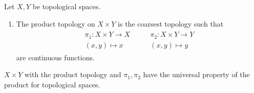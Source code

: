 \documentclass[12pt, twosided]{article}
\begin{document}
\begin{thm}
  Let \(X, Y\) be topological spaces.
  \begin{enumerate}
  \item The product topology on \(X \times Y\) is the coarsest topology such that
    \begin{align*}
      \begin{matrix}
        \pi_1: X \times Y \to X \\ (x, y) \mapsto x
      \end{matrix} \quad\quad
      \begin{matrix}
        \pi_2: X \times Y \to Y \\ (x, y) \mapsto y
      \end{matrix}
    \end{align*} are continuous functions.
  \end{enumerate}
\item \(X \times Y\) with the product topology and \(\pi_1, \pi_2\) have the universal property of the product for topological spaces.
\end{thm}
\end{document}
